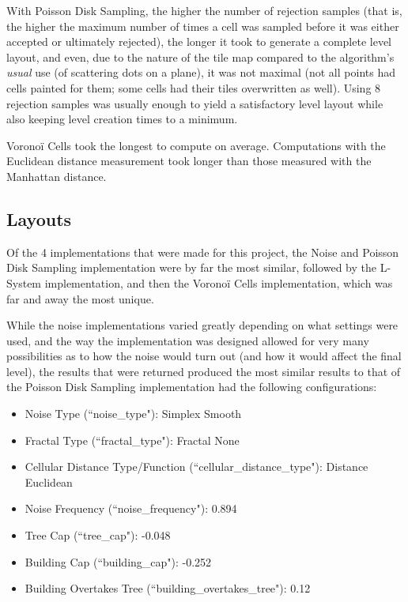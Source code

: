 With Poisson Disk Sampling, the higher the number of rejection samples (that is, the higher the maximum number of times a cell was sampled before it was either accepted or ultimately rejected), the longer it took to generate a complete level layout, and even, due to the nature of the tile map compared to the algorithm's \textit{usual} use (of scattering dots on a plane), it was not maximal (not all points had cells painted for them; some cells had their tiles overwritten as well). Using 8 rejection samples was usually enough to yield a satisfactory level layout while also keeping level creation times to a minimum.

Voronoï Cells took the longest to compute on average. Computations with the Euclidean distance measurement took longer than those measured with the Manhattan distance.

\subsection{Layouts}

Of the 4 implementations that were made for this project, the Noise and Poisson Disk Sampling implementation were by far the most similar, followed by the L-System implementation, and then the Voronoï Cells implementation, which was far and away the most unique.

While the noise implementations varied greatly depending on what settings were used, and the way the implementation was designed allowed for very many possibilities as to how the noise would turn out (and how it would affect the final level), the results that were returned produced the most similar results to that of the Poisson Disk Sampling implementation had the following configurations:

\begin{itemize} \label{noisedefaults}
    \item Noise Type (``noise\_type"): Simplex Smooth
    \item Fractal Type (``fractal\_type"): Fractal None
    \item Cellular Distance Type/Function (``cellular\_distance\_type"): Distance Euclidean
    \item Noise Frequency (``noise\_frequency"): 0.894
    \item Tree Cap (``tree\_cap"): -0.048
    \item Building Cap (``building\_cap"): -0.252
    \item Building Overtakes Tree (``building\_overtakes\_tree"): 0.12
\end{itemize}

